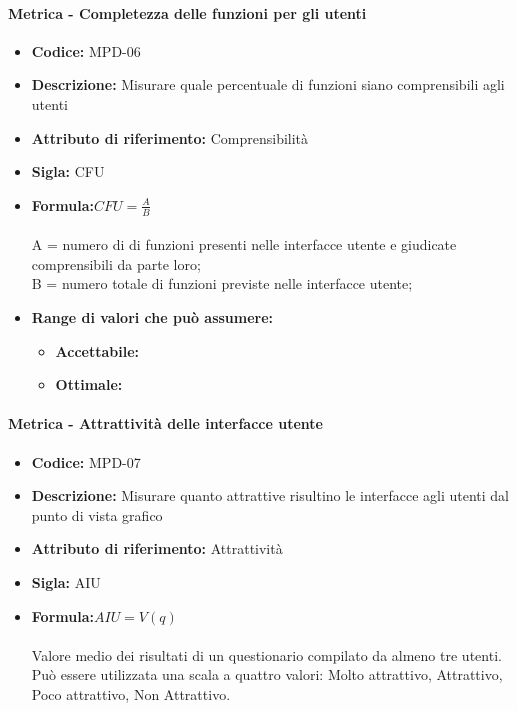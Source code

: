                 \paragraph{Metrica - Completezza delle funzioni per gli utenti} 
                   \begin{itemize}
         \item   \textbf{Codice: } MPD-06
         \item   \textbf{Descrizione:} Misurare quale percentuale di funzioni siano comprensibili agli utenti
         \item   \textbf{Attributo di riferimento:} Comprensibilità
          \item  \textbf{Sigla:} CFU
          \item  \textbf{Formula:}\begin{math}CFU = \frac{A}{B}\end{math}\\ \\
             A = numero di di funzioni presenti nelle interfacce utente e giudicate comprensibili da parte loro;\\
              B = numero totale di funzioni previste nelle interfacce utente;
            \item \textbf{Range di valori che può assumere:}
        \begin{itemize}
            \item \textbf{Accettabile:} 
            \item \textbf{Ottimale:} 
        \end{itemize}
       \end{itemize}
              
           
                   \paragraph{Metrica - Attrattività delle interfacce utente} 
                      \begin{itemize}
          \item  \textbf{Codice: } MPD-07
          \item  \textbf{Descrizione:} Misurare quanto attrattive risultino le interfacce agli utenti dal punto di vista grafico 
          \item  \textbf{Attributo di riferimento:} Attrattività
          \item  \textbf{Sigla:} AIU
           \item \textbf{Formula:}\begin{math}AIU = V (q) \end{math}\\ \\
             Valore medio dei risultati di un questionario compilato da almeno tre utenti.\\
         Può essere utilizzata una scala a quattro valori: Molto attrattivo, Attrattivo, Poco attrattivo, Non Attrattivo.
           \end{itemize}
           
